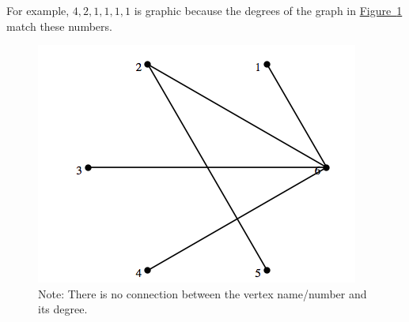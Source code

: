 \documentclass[10pt,]{book}
\theoremstyle{plain}
\theoremstyle{definition}
\theoremstyle{definition}
\theoremstyle{definition}
\theoremstyle{definition}
\theoremstyle{definition}
\numberwithin{equation}{section}
\begin{document}
\par
 For example, \(4,2,1,1,1,1\) is graphic because the degrees of the graph in \hyperref[fig-degree-sequence-example]{Figure~\ref{fig-degree-sequence-example}}
 match these numbers.%
\leavevmode%
\begin{figure}
\centering
\includegraphics[width=1\linewidth]{images/fig-degree-sequence-example.png}
\caption{Note: There is no connection between the vertex name/number and its degree.
                \label{fig-degree-sequence-example}}
\end{figure}
\end{document}
